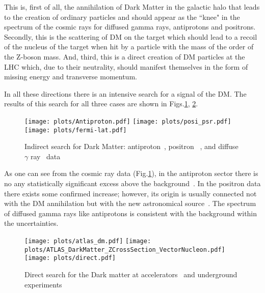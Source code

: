 \documentclass{cernyrep}
\begin{document}
This is, first of all, the annihilation of Dark Matter in the galactic halo that leads to the creation of ordinary particles and should appear as the ``knee" in the spectrum of the cosmic rays for diffused gamma rays, antiprotons and positrons.  Secondly, this is the scattering of DM on the target which should lead to a recoil  of the nucleus of the target when hit by a particle with the mass of the order of the Z-boson mass. And, third, this is a direct creation of DM particles at the LHC which, due to their neutrality, should manifest themselves in the form of missing energy and transverse momentum.

In all these directions  there is an intensive search for a signal of the DM. The results of this search for all three cases are shown in Figs.\ref{indirect}, \ref{direct}.
\begin{figure}[htb]
\begin{center}
\leavevmode
\texttt{[image: plots/Antiproton.pdf]}
\texttt{[image: plots/posi\_psr.pdf]}
\texttt{[image: plots/fermi-lat.pdf]}
\end{center}\caption{Indirect search for Dark Matter: antiproton~\cite{Antiproton}, positron ~\cite{positron}, and diffuse $\gamma$ ray~\cite{fermi-lat} data}
\label{indirect}
\end{figure}
As one can see from the cosmic ray data (Fig.\ref{indirect}), in the antiproton sector there is no any statistically significant excess above the background~\cite{Antiproton}. In the positron data there exists some confirmed increase; however,  its origin is usually connected not with the DM annihilation but with the new astronomical source~\cite{positron}. The spectrum of diffused gamma rays like antiprotons is consistent with the background within the uncertainties.


\begin{figure}[htb]
\begin{center}\vspace{-1cm}
\leavevmode
\texttt{[image: plots/atlas\_dm.pdf]}
\texttt{[image: plots/ATLAS\_DarkMatter\_ZCrossSection\_VectorNucleon.pdf]}
\texttt{[image: plots/direct.pdf]}
\end{center}\vspace{-0.5cm}
\caption{Direct search for the Dark matter at accelerators~\cite{atlas_dm} and underground experiments~\cite{direct}}
\label{direct}
\end{figure}
\end{document}
